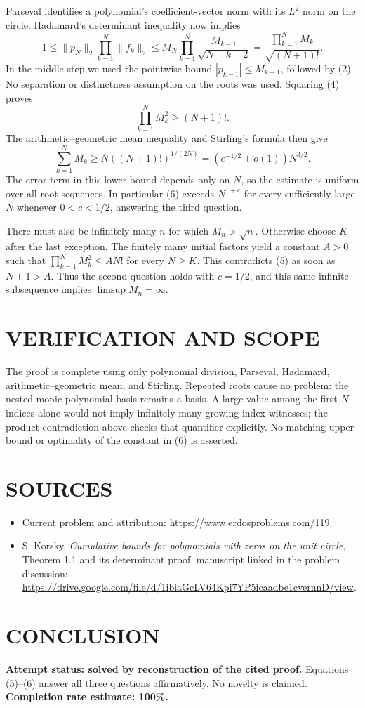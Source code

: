 Parseval identifies a polynomial's coefficient-vector norm with its $L^2$ norm on the circle. Hadamard's determinant inequality now implies
\[
1\leq \|p_N\|_2\prod_{k=1}^N\|f_k\|_2
\leq M_N\prod_{k=1}^N\frac{M_{k-1}}{\sqrt{N-k+2}}
=\frac{\prod_{k=1}^NM_k}{\sqrt{(N+1)!}}.
\tag{4}
\]
In the middle step we used the pointwise bound $|p_{k-1}|\leq M_{k-1}$, followed by (2). No separation or distinctness assumption on the roots was used. Squaring (4) proves
\[
\prod_{k=1}^NM_k^2\geq(N+1)!.
\tag{5}
\]
The arithmetic--geometric mean inequality and Stirling's formula then give
\[
\sum_{k=1}^NM_k\geq N((N+1)!)^{1/(2N)}
=(e^{-1/2}+o(1))N^{3/2}.
\tag{6}
\]
The error term in this lower bound depends only on $N$, so the estimate is uniform over all root sequences. In particular (6) exceeds $N^{1+c}$ for every sufficiently large $N$ whenever $0<c<1/2$, answering the third question.

There must also be infinitely many $n$ for which $M_n>\sqrt n$. Otherwise choose $K$ after the last exception. The finitely many initial factors yield a constant $A>0$ such that $\prod_{k=1}^NM_k^2\leq A N!$ for every $N\geq K$. This contradicts (5) as soon as $N+1>A$. Thus the second question holds with $c=1/2$, and this same infinite subsequence implies $\limsup M_n=\infty$.

\section{VERIFICATION AND SCOPE}
The proof is complete using only polynomial division, Parseval, Hadamard, arithmetic--geometric mean, and Stirling. Repeated roots cause no problem: the nested monic-polynomial basis remains a basis. A large value among the first $N$ indices alone would not imply infinitely many growing-index witnesses; the product contradiction above checks that quantifier explicitly. No matching upper bound or optimality of the constant in (6) is asserted.

\section{SOURCES}
\begin{itemize}
\item Current problem and attribution: \url{https://www.erdosproblems.com/119}.
\item S. Korsky, \emph{Cumulative bounds for polynomials with zeros on the unit circle}, Theorem 1.1 and its determinant proof, manuscript linked in the problem discussion: \url{https://drive.google.com/file/d/1ibiaGcLV64Kpi7YP5icaadbe1cvernnD/view}.
\end{itemize}

\section{CONCLUSION}
\textbf{Attempt status: solved by reconstruction of the cited proof.} Equations (5)--(6) answer all three questions affirmatively. No novelty is claimed.
\textbf{Completion rate estimate: 100\%.}
